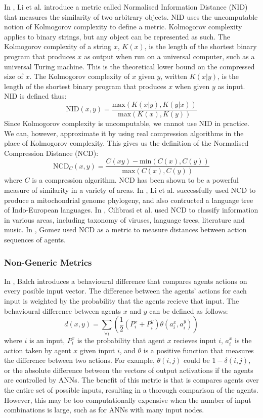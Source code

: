 \documentclass[12pt]{article} %
\begin{document}
In \cite{Li2004}, Li et al. introduce a metric called Normalised Information Distance (NID) that measures the similarity of two arbitrary objects. NID uses the uncomputable notion of Kolmogorov complexity to define a metric. Kolmogorov complexity applies to binary strings, but any object can be represented as such. The Kolmogorov complexity of a string $x$, $K(x)$, is the length of the shortest binary program that produces $x$ as output when run on a universal computer, such as a universal Turing machine. This is the theoretical lower bound on the compressed size of $x$. The Kolmogorov complexity of $x$ given $y$, written $K(x|y)$, is the length of the shortest binary program that produces $x$ when given $y$ as input. NID is defined thus:
\[
\text{NID}(x,y) = \frac{\text{max}(K(x|y), K(y|x))}{\text{max}(K(x), K(y))}
\]
Since Kolmogorov complexity is uncomputable, we cannot use NID in practice. We can, however, approximate it by using real compression algorithms in the place of Kolmogorov complexity. This gives us the definition of the Normalised Compression Distance (NCD):
\[
\text{NCD}_C(x,y) = \frac{C(xy) - \text{min}(C(x), C(y))}{\text{max}(C(x),C(y))}
\]
where $C$ is a compression algorithm. NCD has been shown to be a powerful measure of similarity in a variety of areas. In \cite{Li2004}, Li et al. successfully used NCD to produce a mitochondrial genome phylogeny, and also contructed a language tree of Indo-European languages. In \cite{Cilibrasi2005}, Cilibrasi et al. used NCD to classify information in various areas, including taxonomy of viruses, language trees, literature and music. In \cite{Gomez2009}, Gomez used NCD as a metric to measure distances between action sequences of agents.

\subsubsection{Non-Generic Metrics}

In \cite{Balch1997}, Balch introduces a behavioural difference that compares agents actions on every posible input vector. The difference between the agents' actions for each input is weighted by the probability that the agents recieve that input. The behavioural difference between agents $x$ and $y$ can be defined as follows:
\[
d(x,y) = \displaystyle\sum\limits_{\forall i}\left(\frac{1}{2}(P_i^x + P_i^y)\theta(a_i^x,a_i^y)\right)
\]
where $i$ is an input, $P_i^x$ is the probability that agent $x$ recieves input $i$, $a_i^x$ is the action taken by agent $x$ given input $i$, and $\theta$ is a positive function that measures the difference between two actions. For example, $\theta(i,j)$ could be $1 - \delta(i,j)$, or the absolute difference between the vectors of output activations if the agents are controlled by ANNs. The benefit of this metric is that is compares agents over the entire set of possible inputs, resulting in a thorough comparison of the agents. However, this may be too computationally expensive when the number of input combinations is large, such as for ANNs with many input nodes.

{}

\end{document}
